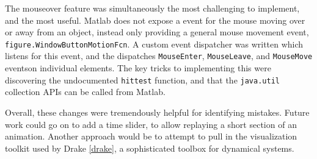 \documentclass[main.tex]{subfiles}
\begin{document}
The mouseover feature was simultaneously the most challenging to implement, and the most useful.
Matlab does not expose a event for the mouse moving over or away from an object, instead only providing a general mouse movement event, \texttt{figure.WindowButtonMotionFcn}.
A custom event dispatcher was written which listens for this event, and the dispatches \texttt{MouseEnter}, \texttt{MouseLeave}, and \texttt{MouseMove} events\footnotemark on individual elements.
The key tricks to implementing this were discovering the undocumented \texttt{hittest} function\cite{matlab-hittest}, and that the \texttt{java.util} collection APIs can be called from Matlab.


Overall, these changes were tremendously helpful for identifying mistakes.
Future work could go on to add a time slider, to allow replaying a short section of an animation. Another approach would be to attempt to pull in the visualization toolkit used by Drake \cref{drake}, a sophisticated toolbox for dynamical systems.

\end{document}
